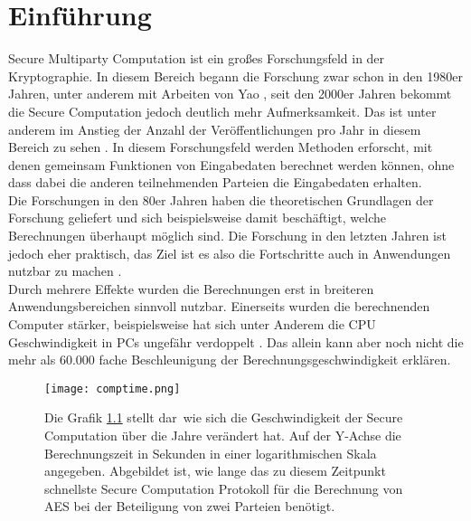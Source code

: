 \chapter{Einführung}
Secure Multiparty Computation ist ein großes Forschungsfeld in der Kryptographie. In diesem Bereich begann die Forschung zwar schon in den 1980er Jahren, unter anderem mit Arbeiten von Yao \cite{Yao1982}, seit den 2000er Jahren bekommt die Secure Computation jedoch deutlich mehr Aufmerksamkeit. Das ist unter anderem im Anstieg der Anzahl der Veröffentlichungen pro Jahr in diesem Bereich zu sehen \cite{Kogan2021}. 
In diesem Forschungsfeld werden Methoden erforscht, mit denen gemeinsam Funktionen von Eingabedaten berechnet werden können, ohne dass dabei die anderen teilnehmenden Parteien die Eingabedaten erhalten.\\
Die Forschungen in den 80er Jahren haben die theoretischen Grundlagen der Forschung geliefert und sich beispielsweise damit beschäftigt, welche Berechnungen überhaupt möglich sind. Die Forschung in den letzten Jahren ist jedoch eher praktisch, das Ziel ist es also die Fortschritte auch in Anwendungen nutzbar zu machen \cite{Kogan2021}.\\
Durch mehrere Effekte wurden die Berechnungen erst in breiteren Anwendungsbereichen sinnvoll nutzbar. Einerseits wurden die berechnenden Computer stärker, beispielsweise hat sich unter Anderem die CPU Geschwindigkeit in PCs ungefähr verdoppelt  \cite{Kogan2021}. Das allein kann aber noch nicht die mehr als 60.000 fache Beschleunigung der Berechnungsgeschwindigkeit \cite{Kogan2021} erklären. 
\begin{figure}[H]
\begin{center}
\texttt{[image: comptime.png]}
\caption{
Die Grafik \ref{evolution_of_computation} stellt dar\, wie sich die Geschwindigkeit der Secure Computation über die Jahre verändert hat.
Auf der Y-Achse die Berechnungszeit in Sekunden in einer logarithmischen Skala angegeben. Abgebildet ist, wie lange das zu diesem Zeitpunkt schnellste Secure Computation Protokoll für die Berechnung von AES bei der Beteiligung von zwei Parteien benötigt.\\
}
\cite{Kogan2021}
\label{evolution_of_computation}
\end{center}

\end{figure}

